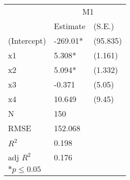 \begin{tabular}{*{3}{l}}
 \hline
                &\multicolumn{2}{c}{M1}   \\
                &Estimate &(S.E.) \\
 \hline
 \hline
  (Intercept)    & -269.01*  &   (95.835) \\
  x1             &  5.308*  &   (1.161) \\
  x2             &  5.094*  &   (1.332) \\
  x3             & -0.371  &   (5.05) \\
  x4             &  10.649  &   (9.45) \\
 \hline 
 N                &150      &       \\
 RMSE            &152.068        & \\
 $R^2$           &0.198        & \\
 adj $R^2$       &0.176        & \\
 \hline
 \hline
 
 \multicolumn{2}{l}{${*}  p \le 0.05$   }\\
 \end{tabular}